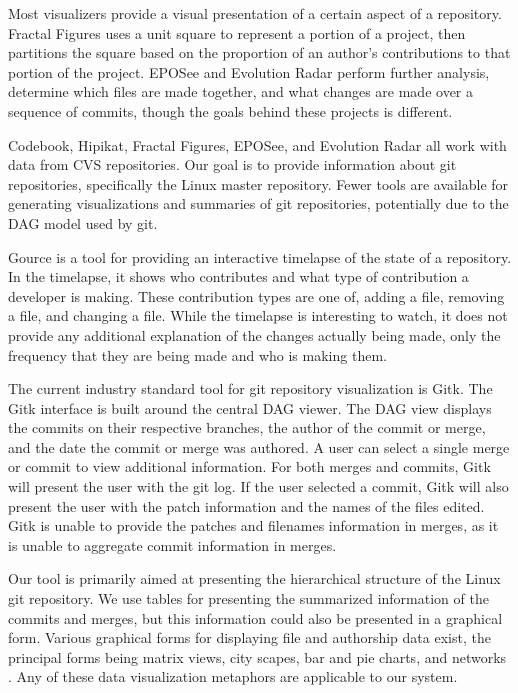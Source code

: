 \documentclass[conference, draftclsnofoot, draft]{IEEEtran}
\begin{document}
Most visualizers provide a visual presentation of a certain aspect of a repository.
Fractal Figures \cite{Ambros2005} uses a unit square to represent a portion of a
project, then partitions the square based on the proportion of an author's
contributions to that portion of the project. EPOSee\cite{Burch2005} and Evolution
Radar\cite{Ambros2009} perform further analysis, determine which files are made
together, and what changes are made over a sequence of commits, though the goals
behind these projects is different.

Codebook, Hipikat, Fractal Figures, EPOSee, and Evolution Radar all work with data
from CVS repositories. Our goal is to provide information about git repositories,
specifically the Linux master repository. Fewer tools are available for generating
visualizations and summaries of git repositories, potentially due to the DAG model
used by git.

Gource is a tool for providing an interactive timelapse of the state of a
repository\cite{Caudwell2010}. In the timelapse, it shows who contributes and what
type of contribution a developer is making. These contribution types are one of,
adding a file, removing a file, and changing a file. While the timelapse is
interesting to watch, it does not provide any additional explanation of the changes
actually being made, only the frequency that they are being made and who is making
them.

The current industry standard tool for git repository visualization is Gitk. The
Gitk interface is built around the central DAG viewer. The DAG view displays the
commits on their respective branches, the author of the commit or merge, and the
date the commit or merge was authored. A user can select a single merge or commit
to view additional information. For both merges and commits, Gitk will present the
user with the git log. If the user selected a commit, Gitk will also present the
user with the patch information and the names of the files edited. Gitk is unable to
provide the patches and filenames information in merges, as it is unable to
aggregate commit information in merges.

Our tool is primarily aimed at presenting the hierarchical structure of the Linux
git repository. We use tables for presenting the summarized information of the
commits and merges, but this information could also be presented in a graphical
form. Various graphical forms for displaying file and authorship data exist, the
principal forms being matrix views, city scapes, bar and pie charts, and networks
\cite{Eick2002}. Any of these data visualization metaphors are applicable to our
system.
\end{document}
